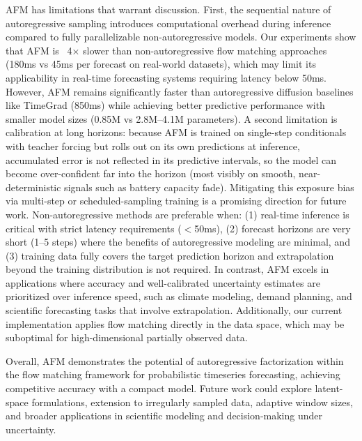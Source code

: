 \documentclass[preprint,12pt,authoryear]{elsarticle}
\newcommand{\oldrev}[1]{#1}
\begin{document}
AFM has limitations that warrant discussion. First, the sequential nature of autoregressive sampling introduces computational overhead during inference compared to fully parallelizable non-autoregressive models. Our experiments show that AFM is ~4× slower than non-autoregressive flow matching approaches (180ms vs 45ms per forecast on real-world datasets), which may limit its applicability in real-time forecasting systems requiring latency below 50ms. However, AFM remains significantly faster than autoregressive diffusion baselines like TimeGrad (850ms) while achieving better predictive performance with smaller model sizes (0.85M vs 2.8M--4.1M parameters). \oldrev{A second limitation is calibration at long horizons: because AFM is trained on single-step conditionals with teacher forcing but rolls out on its own predictions at inference, accumulated error is not reflected in its predictive intervals, so the model can become over-confident far into the horizon (most visibly on smooth, near-deterministic signals such as battery capacity fade). Mitigating this exposure bias via multi-step or scheduled-sampling training is a promising direction for future work.}
Non-autoregressive methods are preferable when: (1) real-time inference is critical with strict latency requirements ($<$50ms), (2) forecast horizons are very short (1--5 steps) where the benefits of autoregressive modeling are minimal, and (3) training data fully covers the target prediction horizon and extrapolation beyond the training distribution is not required. In contrast, AFM excels in applications where accuracy and well-calibrated uncertainty estimates are prioritized over inference speed, such as climate modeling, demand planning, and scientific forecasting tasks that involve extrapolation. 
Additionally, our current implementation applies flow matching directly in the data space, which may be suboptimal for high-dimensional partially observed data. 

\oldrev{Overall, AFM demonstrates the potential of autoregressive factorization within the flow matching framework for probabilistic timeseries forecasting, achieving competitive accuracy with a compact model. Future work could explore latent-space formulations, extension to irregularly sampled data, adaptive window sizes, and broader applications in scientific modeling and decision-making under uncertainty.}






\clearpage
\appendix
\end{document}

